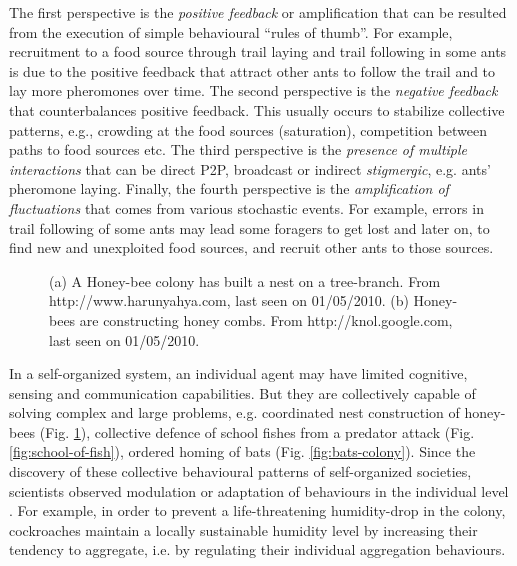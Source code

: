 The first perspective is the {\em  positive feedback} or amplification that can be resulted from the execution of simple behavioural ``rules of thumb''. For example, recruitment to a food source through trail laying and trail following in some ants  is due to the positive feedback that attract other ants to follow the trail and to lay more pheromones over time. The second perspective is the {\em negative feedback} that counterbalances positive feedback. This usually occurs to stabilize collective patterns, e.g., crowding at the food sources (saturation), competition between paths to food sources etc. The third perspective is the {\em presence of multiple  interactions} that can be direct \acf{P2P}, broadcast or indirect {\em stigmergic}, e.g. ants' pheromone laying. Finally, the fourth  perspective is the {\em amplification of fluctuations} that comes from various stochastic events. For example, errors in trail following of some ants may lead some foragers to get lost and later on, to find new and unexploited food sources, and recruit other ants to those sources.

\begin{figure}
\centering
{} 
\hspace{0.25cm}
\caption{(a) A Honey-bee colony has built a nest on a tree-branch. From http://www.harunyahya.com, last seen on 01/05/2010. (b) Honey-bees are constructing honey combs. From http://knol.google.com, last seen on 01/05/2010.}
\label{fig:honey-bee-nest}
\end{figure}
% 
In a self-organized system, an individual agent may have limited cognitive, sensing and communication capabilities. But they are collectively capable of solving complex and large problems, e.g. coordinated nest construction of honey-bees (Fig. \ref{fig:honey-bee-nest}), collective defence of school fishes from a predator attack (Fig. \ref{fig:school-of-fish}), ordered homing of bats (Fig. \ref{fig:bats-colony}).  Since the discovery of these collective behavioural patterns of self-organized societies, scientists observed modulation or adaptation of behaviours in the individual level \cite{Garnier+2007}. For example, in order to prevent a life-threatening humidity-drop in the colony, cockroaches maintain a locally sustainable humidity level by increasing their tendency to aggregate, i.e. by regulating their individual aggregation behaviours. 

